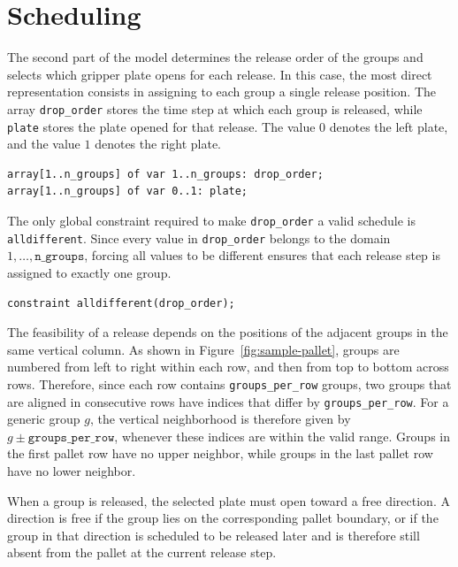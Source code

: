 \section{Scheduling}

The second part of the model determines the release order of the groups and
selects which gripper plate opens for each release. In this case, the most
direct representation consists in assigning to each group a single release
position. The array \texttt{drop\_order} stores the time step at which each
group is released, while \texttt{plate} stores the plate opened for that release.
The value \(0\) denotes the left plate, and the value \(1\) denotes the right
plate.

\vspace{0.5cm}
\begin{lstlisting}
array[1..n_groups] of var 1..n_groups: drop_order;
array[1..n_groups] of var 0..1: plate;
\end{lstlisting}
\vspace{0.5cm}
The only global constraint required to make \texttt{drop\_order} a valid
schedule is \texttt{alldifferent}. Since every value in \texttt{drop\_order}
belongs to the domain \(1,\dots,\texttt{n\_groups}\), forcing all values to be
different ensures that each release step is assigned to exactly one group.

\vspace{0.5cm}
\begin{lstlisting}
constraint alldifferent(drop_order);
\end{lstlisting}
\vspace{0.5cm}
The feasibility of a release depends on the positions of the adjacent groups in the same
vertical column. As shown in Figure~\ref{fig:sample-pallet}, groups are
numbered from left to right within each row, and then from top to
bottom across rows.
Therefore, since each row contains \texttt{groups\_per\_row} groups,
two groups that are aligned in consecutive rows have indices
that differ by \texttt{groups\_per\_row}. For a generic group \(g\),
the vertical neighborhood is therefore given by 
$g \pm \texttt{groups\_per\_row}$, whenever these indices are within the valid range.
Groups in the first pallet row have no upper neighbor,
while groups in the last pallet row have no lower neighbor.

When a group is released, the selected plate must open toward a free direction.
A direction is free if the group lies on the corresponding pallet boundary, or
if the group in that direction is scheduled to be released later and is
therefore still absent from the pallet at the current release step.

